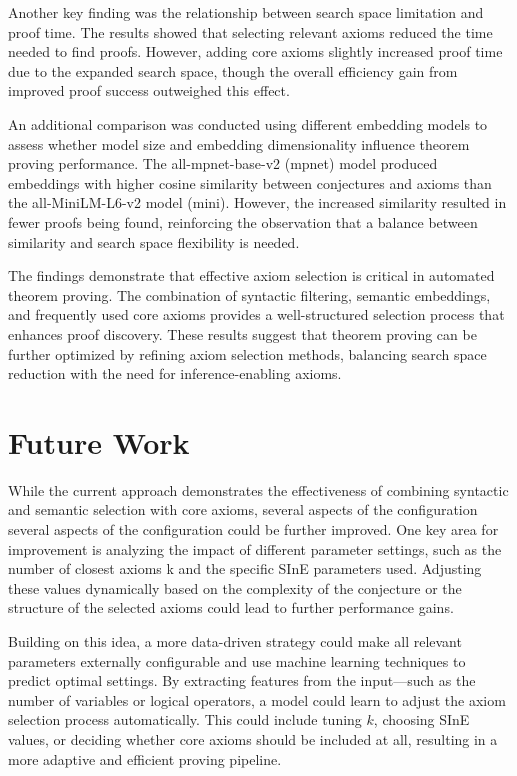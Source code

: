 \documentclass[english,version-2020-11]{uzl-thesis}
\begin{document}
Another key finding was the relationship between search space limitation and proof time. The results showed that selecting relevant axioms reduced the time needed to find proofs. However, adding core axioms slightly increased proof time due to the expanded search space, though the overall efficiency gain from improved proof success outweighed this effect.

An additional comparison was conducted using different embedding models to assess whether model size and embedding dimensionality influence theorem proving performance. The all-mpnet-base-v2 (mpnet) model produced embeddings with higher cosine similarity between conjectures and axioms than the all-MiniLM-L6-v2 model (mini). However, the increased similarity resulted in fewer proofs being found, reinforcing the observation that a balance between similarity and search space flexibility is needed. 

The findings demonstrate that effective axiom selection is critical in automated theorem proving. The combination of syntactic filtering, semantic embeddings, and frequently used core axioms provides a well-structured selection process that enhances proof discovery. These results suggest that theorem proving can be further optimized by refining axiom selection methods, balancing search space reduction with the need for inference-enabling axioms.


\chapter{Future Work}
\label{chapter-futerwork}

While the current approach demonstrates the effectiveness of combining syntactic and semantic selection with core axioms, several aspects of the configuration several aspects of the configuration could be further improved. One key area for improvement is analyzing the impact of different parameter settings, such as the number of closest axioms k and the specific SInE parameters used. Adjusting these values dynamically based on the complexity of the conjecture or the structure of the selected axioms could lead to further performance gains.

Building on this idea, a more data-driven strategy could make all relevant parameters externally configurable and use machine learning techniques to predict optimal settings. By extracting features from the input—such as the number of variables or logical operators, a model could learn to adjust the axiom selection process automatically. This could include tuning \( k \), choosing SInE values, or deciding whether core axioms should be included at all, resulting in a more adaptive and efficient proving pipeline.
\end{document}
